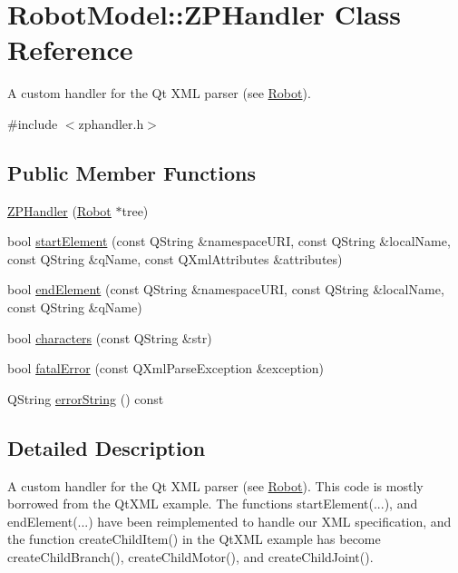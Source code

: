 \hypertarget{class_robot_model_1_1_z_p_handler}{
\section{RobotModel::ZPHandler Class Reference}
\label{class_robot_model_1_1_z_p_handler}
}


A custom handler for the Qt XML parser (see \hyperlink{class_robot_model_1_1_robot}{Robot}).  


{\ttfamily \#include $<$zphandler.h$>$}\subsection*{Public Member Functions}
\begin{DoxyCompactItemize}
\item 
\hyperlink{class_robot_model_1_1_z_p_handler_aa418554ca19e4c6f79cf7c2b3e747723}{ZPHandler} (\hyperlink{class_robot_model_1_1_robot}{Robot} $\ast$tree)
\item 
bool \hyperlink{class_robot_model_1_1_z_p_handler_a4041ee7deb5a59d83d6eab98101844d9}{startElement} (const QString \&namespaceURI, const QString \&localName, const QString \&qName, const QXmlAttributes \&attributes)
\item 
bool \hyperlink{class_robot_model_1_1_z_p_handler_ab058af372b5178f8877907ee45b8257d}{endElement} (const QString \&namespaceURI, const QString \&localName, const QString \&qName)
\item 
bool \hyperlink{class_robot_model_1_1_z_p_handler_a246f066600bede52d4321d0ccebd5cec}{characters} (const QString \&str)
\item 
bool \hyperlink{class_robot_model_1_1_z_p_handler_a442f6837417a1baa0d60641ddd854109}{fatalError} (const QXmlParseException \&exception)
\item 
QString \hyperlink{class_robot_model_1_1_z_p_handler_aca3c34530b327d635a4e915992f576de}{errorString} () const 
\end{DoxyCompactItemize}


\subsection{Detailed Description}
A custom handler for the Qt XML parser (see \hyperlink{class_robot_model_1_1_robot}{Robot}). This code is mostly borrowed from the QtXML example. The functions startElement(...), and endElement(...) have been reimplemented to handle our XML specification, and the function createChildItem() in the QtXML example has become createChildBranch(), createChildMotor(), and createChildJoint().

